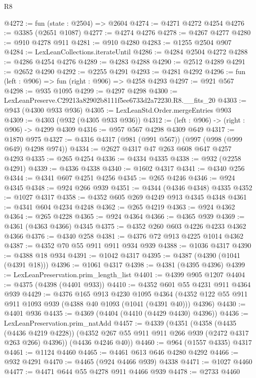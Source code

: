 \begin{lexlean}{R8}
\begin{coremodule}
@4272 := fun (state : @2504) => @2604
@4274 := @4271 @4272 @4254
@4276 := @3385 (@2651 @1087)
@4277 := @4274 @4276
@4278 := @4267 @4277
@4280 := @910 @4278 @911
@4281 := @910 @4280
@4283 := @1255 @2504 @907
@4284 := LexLeanCollections.iterateUntil
@4286 := @4284 @2504 @4272
@4288 := @4286 @4254 @4276
@4289 := @4283 @4288
@4290 := @2512 @4289
@4291 := @2652 @4290
@4292 := @2255 @4291
@4293 := @4281 @4292
@4296 := fun (left : @906) => fun (right : @906) => @4258 @4293
@4297 := @921 @567
@4298 := @935 @1095
@4299 := @4297 @4298
@4300 := LexLeanPreserve.C29213a82902b8111f5ee6733d2a72230.R8.__fits_20
@4303 := @943 (@4300 @933 @936)
@4305 := LexLeanStd.Order.mergeEntries @903
@4309 := @4303 (@932 (@4305 @933 @936))
@4312 := (left : @906) -> (right : @906) -> @4299 @4309
@4316 := @957 @567 @4298 @4309 @649
@4317 := @1870 @975
@4327 := @4316 @4317 (@981 (@991 @567)) (@997 (@998 (@999 @649) @4298 @974))
@4334 := @2627 @4317 @47 @263 @608 @647 @4257 @4293
@4335 := @265 @4254
@4336 := @4334 @4335
@4338 := @932 (@2258 @4291)
@4339 := @4336 @4338
@4340 := @1602 @4317
@4341 := @4340 @256
@4344 := @4341 @607 @4251 @4256
@4345 := @265 @4246
@4346 := @924 @4345
@4348 := @924 @266 @939
@4351 := @4344 (@4346 @4348) @4335
@4352 := @1027 @4317
@4358 := @4352 @605 @269 @4249 @913 @4345 @4348
@4361 := @4341 @604 @4234 @4248
@4362 := @265 @4219
@4363 := @924 @4362
@4364 := @265 @4228
@4365 := @924 @4364
@4366 := @4365 @939
@4369 := @4361 (@4363 @4366) @4345
@4375 := @4352 @260 @603 @4226 @4233 @4362 @4366
@4376 := @4340 @258
@4381 := @4376 @72 @913 @4225 @1014 @4362
@4387 := @4352 @70 @55 @911 @911 @934 @939
@4388 := @1036 @4317
@4390 := @4388 @18 @934
@4391 := @1042 @4317
@4395 := @4387 (@4390 (@1041 (@4391 @18)))
@4396 := @1061 @4317
@4398 := @4381 (@4395 @4396)
@4399 := LexLeanPreservation.prim_length_list
@4401 := @4399 @905 @1207
@4404 := @4375 (@4398 (@4401 @933))
@4410 := @4352 @601 @55 @4231 @911 @4364 @939
@4429 := @4376
    @165
    @913
    @4230
    @1095
    @4364
    (@4352 @122 @55 @911 @911 @1093 @939 (@4388 @40 @1093 (@1041 (@4391 @40))) @4396)
@4430 := @4401 @936
@4435 := @4369 (@4404 (@4410 (@4429 @4430) @4396))
@4436 := LexLeanPreservation.prim_natAdd
@4457 := @4339
    (@4351
      (@4358
        (@4435 (@4436 @4219 @4228))
        (@4352 @267 @55 @911 @911 @266 @939 (@2472 @4317 @263 @266) @4396))
      (@4436 @4246 @40))
@4460 := @964 (@1557 @4335) @4317
@4461 := @1124 @4460
@4465 := @4461 @613 @646 @4280 @4292
@4466 := @932 @4291
@4470 := @4465 (@924 @4466 @939) @4338
@4471 := @1027 @4460
@4477 := @4471 @644 @55 @4278 @911 @4466 @939
@4478 := @2733 @4460

\end{coremodule}
\end{lexlean}
